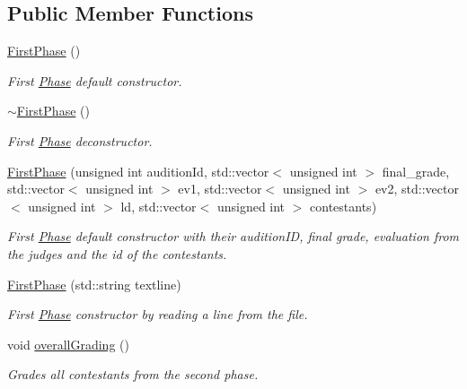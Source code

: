 \subsection*{Public Member Functions}
\begin{DoxyCompactItemize}
\item 
\mbox{\label{class_first_phase_a1e392056f4bdc298e75eed593862561d}} 
\hyperlink{class_first_phase_a1e392056f4bdc298e75eed593862561d}{First\+Phase} ()
\begin{DoxyCompactList}\small\item\em First \hyperlink{class_phase}{Phase} default constructor. \end{DoxyCompactList}\item 
\mbox{\label{class_first_phase_a7ba9ba5a957ae942c52d9d0c27de3391}} 
\hyperlink{class_first_phase_a7ba9ba5a957ae942c52d9d0c27de3391}{$\sim$\+First\+Phase} ()
\begin{DoxyCompactList}\small\item\em First \hyperlink{class_phase}{Phase} deconstructor. \end{DoxyCompactList}\item 
\hyperlink{class_first_phase_a1c8d914b5b30eff510d884cc4ab699d6}{First\+Phase} (unsigned int audition\+Id, std\+::vector$<$ unsigned int $>$ final\+\_\+grade, std\+::vector$<$ unsigned int $>$ ev1, std\+::vector$<$ unsigned int $>$ ev2, std\+::vector$<$ unsigned int $>$ ld, std\+::vector$<$ unsigned int $>$ contestants)
\begin{DoxyCompactList}\small\item\em First \hyperlink{class_phase}{Phase} default constructor with their audition\+ID, final grade, evaluation from the judges and the id of the contestants. \end{DoxyCompactList}\item 
\hyperlink{class_first_phase_a2b8412b1a684c1415841c43950701d01}{First\+Phase} (std\+::string textline)
\begin{DoxyCompactList}\small\item\em First \hyperlink{class_phase}{Phase} constructor by reading a line from the file. \end{DoxyCompactList}\item 
\mbox{\label{class_first_phase_a89e84246611eaed02077e9c0baccac73}} 
void \hyperlink{class_first_phase_a89e84246611eaed02077e9c0baccac73}{overall\+Grading} ()
\begin{DoxyCompactList}\small\item\em Grades all contestants from the second phase. \end{DoxyCompactList}\end{DoxyCompactItemize}
